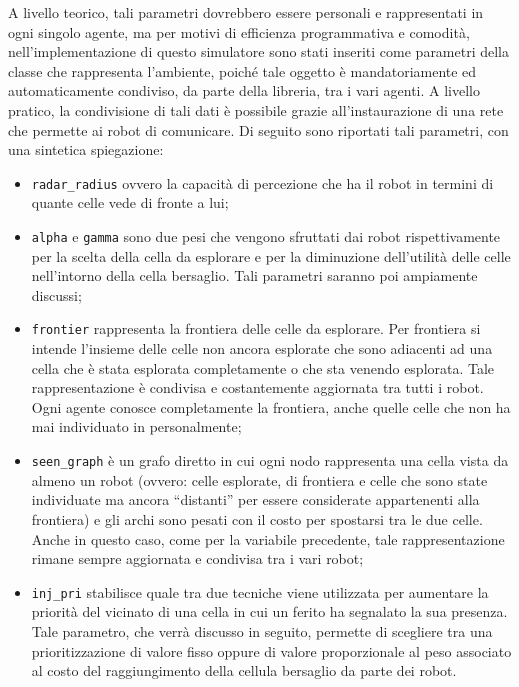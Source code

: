 A livello teorico, tali parametri dovrebbero essere personali e rappresentati in ogni singolo agente, ma per motivi di efficienza programmativa e comodità, nell'implementazione di questo simulatore sono stati inseriti come parametri della classe che rappresenta l'ambiente, poiché tale oggetto è mandatoriamente ed automaticamente condiviso, da parte della libreria, tra i vari agenti. A livello pratico, la condivisione di tali dati è possibile grazie all'instaurazione di una rete che permette ai robot di comunicare.
Di seguito sono riportati tali parametri, con una sintetica spiegazione:
\begin{itemize}
	\item \texttt{radar\_radius} ovvero la capacità di percezione che ha il robot in termini di quante celle vede di fronte a lui;
	\item \texttt{alpha} e \texttt{gamma} sono due pesi che vengono sfruttati dai robot rispettivamente per la scelta della cella da esplorare e per la diminuzione dell'utilità delle celle nell'intorno della cella bersaglio. Tali parametri saranno poi ampiamente discussi;
	\item \texttt{frontier} rappresenta la frontiera delle celle da esplorare. Per frontiera si intende l'insieme delle celle non ancora esplorate che sono adiacenti ad una cella che è stata esplorata completamente o che sta venendo esplorata. Tale rappresentazione è condivisa e costantemente aggiornata tra tutti i robot. Ogni agente conosce completamente la frontiera, anche quelle celle che non ha mai individuato in personalmente;
	\item \texttt{seen\_graph} è un grafo diretto in cui ogni nodo rappresenta una cella vista da almeno un robot (ovvero: celle esplorate, di frontiera e celle che sono state individuate ma ancora “distanti” per essere considerate appartenenti alla frontiera) e gli archi sono pesati con il costo per spostarsi tra le due celle. Anche in questo caso, come per la variabile precedente, tale rappresentazione rimane sempre aggiornata e condivisa tra i vari robot;
	\item \texttt{inj\_pri} stabilisce quale tra due tecniche viene utilizzata per aumentare la priorità del vicinato di una cella in cui un ferito ha segnalato la sua presenza. Tale parametro, che verrà discusso in seguito, permette di scegliere tra una prioritizzazione di valore fisso oppure di valore proporzionale al peso associato al costo del raggiungimento della cellula bersaglio da parte dei robot.
\end{itemize}